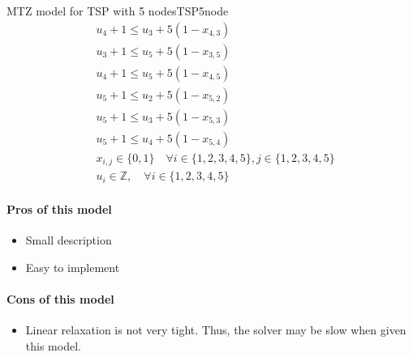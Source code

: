 \begin{example}{MTZ model for TSP with 5 nodes}{TSP5node}
\begin{align*}
 & u_{4} +1 \leq u_{3} + 5  (1-x_{4,3})\\
 & u_{3} +1 \leq  u_{5} + 5 (1-x_{3,5} )\\
 & u_{4} +1 \leq  u_{5} + 5 (1-x_{4,5})\\
 & u_{5} +1 \leq  u_{2} + 5 (1-x_{5,2} )\\
 & u_{5}+1 \leq  u_{3} + 5 (1-x_{5,3} )\\
 & u_{5} +1 \leq  u_{4} + 5 (1-x_{5,4} )\\
 & x_{i,j} \in \{0,1\} \quad\forall i \in \{1,2,3,4,5\}, j \in \{1,2,3,4,5\}\\
 & u_{i} \in \mathbb{Z}, \quad\forall i \in \{1,2,3,4,5\}
\end{align*}
\end{example}

\paragraph{Pros of this model}
\begin{itemize}
\item Small description
\item Easy to implement
\end{itemize}
\paragraph{Cons of this model}
\begin{itemize}
\item Linear relaxation is not very tight.  Thus, the solver may be slow when given this model.
\end{itemize}

